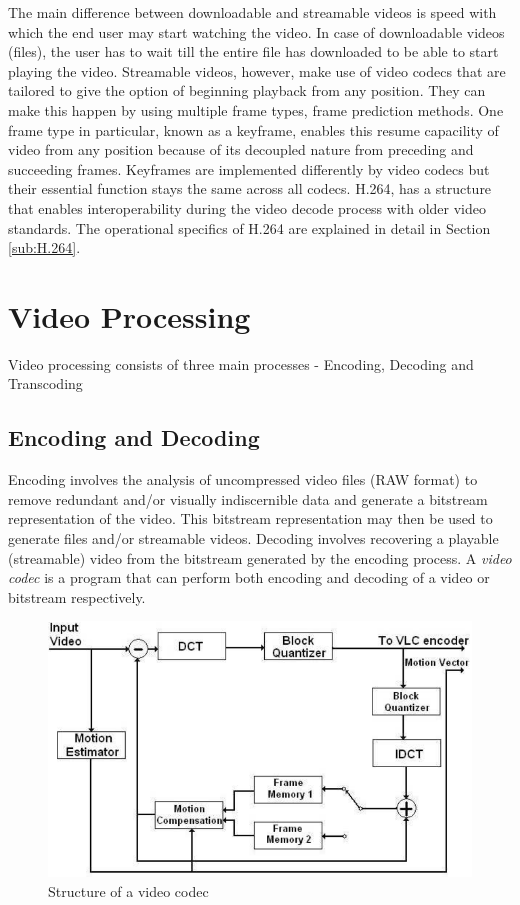 \documentclass[letterpaper,12pt,titlepage,oneside,final]{report}
\begin{document}
            The main difference between downloadable and streamable videos is speed with which the end user may start watching the video. In case of downloadable videos (files), the user has to wait till the entire file has downloaded to be able to start playing the video. Streamable videos, however, make use of video codecs that are tailored to give the option of beginning playback from any position. They can make this happen by using multiple frame types, frame prediction methods. One frame type in particular, known as a keyframe, enables this resume capacility of video from any position because of its decoupled nature from preceding and succeeding frames. Keyframes are implemented differently by video codecs but their essential function stays the same across all codecs. H.264, has a structure that enables interoperability during the video decode process with older video standards. The operational specifics of H.264 are explained in detail in Section \ref{sub:H.264}.

    \section{Video Processing}
        Video processing consists of three main processes - Encoding, Decoding and Transcoding
        \subsection{Encoding and Decoding}
            Encoding involves the analysis of uncompressed video files (RAW format) to remove redundant and/or visually indiscernible data and generate a bitstream representation of the video. This bitstream representation may then be used to generate files and/or streamable videos. Decoding involves recovering a playable (streamable) video from the bitstream generated by the encoding process. A \textit{video codec} is a program that can perform both encoding and decoding of a video or bitstream respectively. 
            \begin{figure}[!h]
                \centering
                \includegraphics[width=\textwidth]{codec}
                \caption{Structure of a video codec}
                \label{codec}
            \end{figure}
\end{document}

